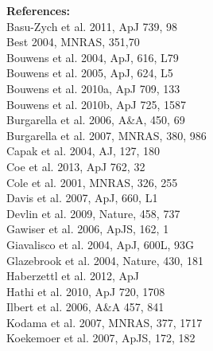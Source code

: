 \documentclass[12pt]{article}
\begin{document}
\newpage
\noindent
{\bf References: }\\
Basu-Zych et al. 2011, ApJ 739, 98 \\                          %
Best 2004, MNRAS, 351,70\\                         %
Bouwens et al. 2004, ApJ, 616, L79\\               %
Bouwens et al. 2005, ApJ, 624, L5\\                %
Bouwens et al. 2010a, ApJ 709, 133\\               %
Bouwens et al. 2010b, ApJ 725, 1587\\              %
Burgarella et al. 2006, A\&A, 450, 69\\            %
Burgarella et al. 2007, MNRAS, 380, 986\\          %
Capak et al. 2004, AJ, 127, 180\\                  %
Coe et al. 2013, ApJ 762, 32\\                     %
Cole et al. 2001, MNRAS, 326, 255\\                %
Davis et al. 2007, ApJ, 660, L1\\                  %
Devlin et al. 2009, Nature, 458, 737\\             %
Gawiser et al. 2006, ApJS, 162, 1\\                %
Giavalisco et al. 2004, ApJ, 600L, 93G\\           %
Glazebrook et al. 2004, Nature, 430, 181\\         %
Haberzettl et al. 2012, ApJ\\                      %
Hathi et al. 2010, ApJ 720, 1708\\                 %
Ilbert et al. 2006, A\&A 457, 841\\                %
Kodama et al. 2007, MNRAS, 377, 1717\\             %
Koekemoer et al. 2007, ApJS, 172, 182\\            %
\end{document}
